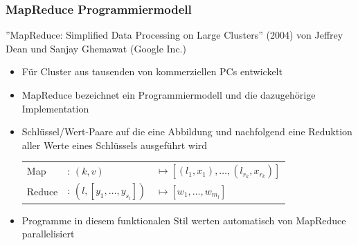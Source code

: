 \begin{frame}
    \frametitle{MapReduce Programmiermodell}
    ''MapReduce: Simplified Data Processing on Large Clusters'' (2004) von Jeffrey Dean und Sanjay Ghemawat (Google Inc.)
    \begin{itemize}
        \item Für Cluster aus tausenden von kommerziellen PCs entwickelt %
        \item MapReduce bezeichnet ein Programmiermodell und die dazugehörige Implementation
        \item Schlüssel/Wert-Paare auf die eine Abbildung und nachfolgend eine Reduktion aller Werte eines Schlüssels ausgeführt wird
              \begin{tabular}{lll}
                  Map     & : $(k,v)$ &
                              $\mapsto \left[(l_1,x_1), \ldots, (l_{r_k},x_{r_k}) \right]$ \\
                  Reduce  & : $(l,\left[ y_1, \ldots, y_{s_l} \right])$ &
                              $\mapsto \left[ w_1, \ldots, w_{m_l} \right] $
              \end{tabular}
        \item Programme in diesem funktionalen Stil werten automatisch von MapReduce parallelisiert
    \end{itemize}
\end{frame}


